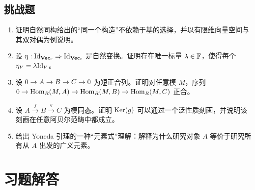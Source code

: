 \subsection*{挑战题}
\begin{enumerate}[resume, label=\textbf{A.\arabic*.}, leftmargin=*, itemsep=0.5em]
\item \hard 证明自然同构给出的“同一个构造”不依赖于基的选择，并以有限维向量空间与其双对偶为例说明。
\item \hard 设 $\eta:\mathrm{Id}_{\mathbf{Vec}_{\mathbb{F}}}\Rightarrow \mathrm{Id}_{\mathbf{Vec}_{\mathbb{F}}}$ 是自然变换。证明存在唯一标量 $\lambda\in\mathbb{F}$，使得每个 $\eta_V=\lambda\mathrm{Id}_V$。
\item \hard 设 $0 \to A \to B \to C \to 0$ 为短正合列。证明对任意模 $M$，序列
$0\to \mathrm{Hom}_R(M,A)\to \mathrm{Hom}_R(M,B)\to \mathrm{Hom}_R(M,C)$
正合。
\item \hard 设 $A\xrightarrow{f}B\xrightarrow{g}C$ 为模同态。证明 $\mathrm{Ker}(g)$ 可以通过一个泛性质刻画，并说明该刻画在任意阿贝尔范畴中都成立。
\item \hard 给出 Yoneda 引理的一种“元素式”理解：解释为什么研究对象 $A$ 等价于研究所有从 $A$ 出发的广义元素。
\end{enumerate}

\section*{习题解答}

